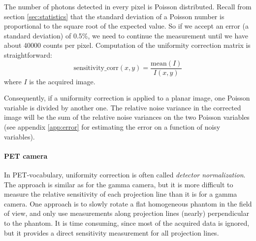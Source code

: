 \documentclass[11pt,oneside]{article}
\begin{document}
The number of photons detected in every pixel is Poisson distributed. Recall
from section \ref{sec:statistics} that the standard deviation of a Poisson
number is proportional to the square root of the expected value. So if we
accept an error (a standard deviation) of 0.5\%, we need to continue the
measurement until we have about 40000 counts per pixel. Computation of the
uniformity correction matrix is straightforward:
\begin{equation}
  \mbox{sensitivity\_corr}(x,y) = \frac{\mbox{mean}(I)}{I(x,y)}
\end{equation}
where $I$ is the acquired image.

Consequently, if a uniformity correction is applied to a planar image, one
Poisson variable is divided by another one. The relative noise variance in
the corrected image will be the sum of the relative noise variances on the
two Poisson variables (see appendix \ref{app:error} for estimating the error
on a function of noisy variables).

\paragraph{PET camera} \label{sec:normalization1}
In PET-vocabulary, uniformity correction is often called {\em detector
normalization}. The approach is similar as for the gamma camera, but
it is more difficult to measure the relative sensitivity of each
projection line than it is for a gamma camera.  One approach is to
slowly rotate a flat homogeneous phantom in the field of view, and
only use measurements along projection lines (nearly) perpendicular to
the phantom. It is time consuming, since most of the acquired data is
ignored, but it provides a direct sensitivity measurement for all
projection lines.
\end{document}
